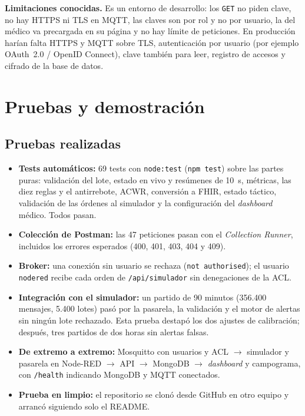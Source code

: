 \documentclass[runningheads]{llncs}
\newcommand{\ruta}[1]{\texttt{#1}}
\begin{document}
\textbf{Limitaciones conocidas.} Es un entorno de desarrollo: los \texttt{GET} no piden clave, no hay HTTPS ni TLS en MQTT, las claves son por rol y no por usuario, la del médico va precargada en su página y no hay límite de peticiones. En producción harían falta HTTPS y MQTT sobre TLS, autenticación por usuario (por ejemplo OAuth~2.0 / OpenID Connect), clave también para leer, registro de accesos y cifrado de la base de datos.

\section{Pruebas y demostración}

\subsection{Pruebas realizadas}

\begin{itemize}
  \item \textbf{Tests automáticos:} 69 tests con \texttt{node:test} (\texttt{npm test}) sobre las partes puras: validación del lote, estado en vivo y resúmenes de 10~s, métricas, las diez reglas y el antirrebote, ACWR, conversión a FHIR, estado táctico, validación de las órdenes al simulador y la configuración del \emph{dashboard} médico. Todos pasan.
  \item \textbf{Colección de Postman:} las 47 peticiones pasan con el \emph{Collection Runner}, incluidos los errores esperados (400, 401, 403, 404 y 409).
  \item \textbf{Broker:} una conexión sin usuario se rechaza (\texttt{not authorised}); el usuario \texttt{nodered} recibe cada orden de \ruta{/api/simulador} sin denegaciones de la ACL.
  \item \textbf{Integración con el simulador:} un partido de 90 minutos (356.400 mensajes, 5.400 lotes) pasó por la pasarela, la validación y el motor de alertas sin ningún lote rechazado. Esta prueba destapó los dos ajustes de calibración; después, tres partidos de dos horas sin alertas falsas.
  \item \textbf{De extremo a extremo:} Mosquitto con usuarios y ACL $\rightarrow$ simulador y pasarela en Node-RED $\rightarrow$ API $\rightarrow$ MongoDB $\rightarrow$ \emph{dashboard} y campograma, con \texttt{/health} indicando MongoDB y MQTT conectados.
  \item \textbf{Prueba en limpio:} el repositorio se clonó desde GitHub en otro equipo y arrancó siguiendo solo el README.
\end{itemize}
\end{document}
